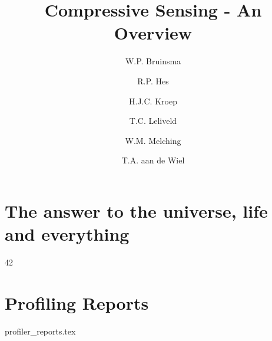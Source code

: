 \documentclass[a4paper, openany, oneside]{memoir}
\title{Compressive Sensing - An Overview}
\author{W.P. Bruinsma \and R.P. Hes \and H.J.C. Kroep \and T.C. Leliveld \and W.M. Melching \and T.A. aan de Wiel}
\begin{document}
\appendix
\chapter{The answer to the universe, life and everything}
42

\chapter{Profiling Reports}
{profiler_reports.tex}
\end{document}
